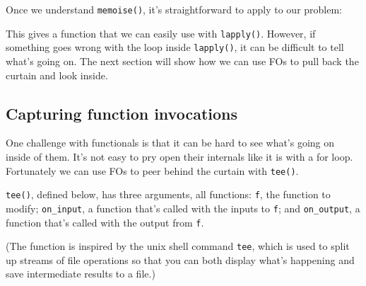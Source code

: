 Once we understand \texttt{memoise()}, it's straightforward to apply to
our problem:

\begin{Shaded}
\begin{Highlighting}[]
\StringTok{ }\NormalTok{(}\NormalTok{, }\NormalTok{(}\NormalTok{(}
\end{Highlighting}
\end{Shaded}

This gives a function that we can easily use with \texttt{lapply()}.
However, if something goes wrong with the loop inside \texttt{lapply()},
it can be difficult to tell what's going on. The next section will show
how we can use FOs to pull back the curtain and look inside.

\subsection{Capturing function invocations}\label{tee}

One challenge with functionals is that it can be hard to see what's
going on inside of them. It's not easy to pry open their internals like
it is with a for loop. Fortunately we can use FOs to peer behind the
curtain with \texttt{tee()}. 

\texttt{tee()}, defined below, has three arguments, all functions:
\texttt{f}, the function to modify; \texttt{on\_input}, a function
that's called with the inputs to \texttt{f}; and \texttt{on\_output}, a
function that's called with the output from \texttt{f}.

\begin{Shaded}
\begin{Highlighting}[]
\StringTok{ }
\StringTok{ }  
    \StringTok{ }
  \NormalTok{\}}
\NormalTok{\}}
\end{Highlighting}
\end{Shaded}

(The function is inspired by the unix shell command \texttt{tee}, which
is used to split up streams of file operations so that you can both
display what's happening and save intermediate results to a file.)

